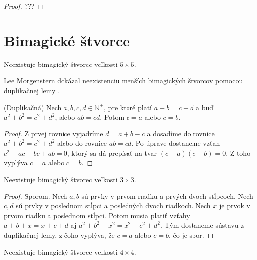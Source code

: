 \begin{proof} 
???
\end{proof}

\section{Bimagické štvorce}

\begin{hypothesis} Neexistuje bimagický štvorec veľkosti $5 \times 5$.
\end{hypothesis}

Lee Morgenstern dokázal neexistenciu menších bimagických štvorcov pomocou duplikačnej lemy \cite{multimagie}.

\begin{lemma} (Duplikačná) Nech $a,b,c,d \in \mathbb{N^+}$, pre ktoré platí $a + b = c + d$ a buď $a^2 + b^2 = c^2 + d^2$, alebo $ab = cd$. Potom $c = a$ alebo $c = b$.
\end{lemma}
 
\begin{proof} Z prvej rovnice vyjadríme $d = a + b - c$ a dosadíme do rovnice $a^2 + b^2 = c^2 + d^2$ alebo do rovnice $ab = cd$. Po úprave dostaneme vzťah $c^2 - ac - bc + ab = 0$, ktorý sa dá prepísať na tvar $(c - a)(c - b) = 0$. Z toho vyplýva $c = a$ alebo $c = b$.
\end{proof} 


\begin{theorem} Neexistuje bimagický štvorec veľkosti $3 \times 3$.
\end{theorem}

\begin{proof} Sporom. Nech $a,b$ sú prvky v prvom riadku a prvých dvoch stĺpcoch. Nech $c,d$ sú prvky v poslednom stĺpci a posledných dvoch riadkoch. Nech $x$ je prvok v prvom riadku a poslednom stĺpci. Potom musia platiť vzťahy $a + b + x = x + c + d$ aj $a^2 + b^2 + x^2 = x^2 + c^2 + d^2$. Tým dostaneme sústavu z duplikačnej lemy, z čoho vyplýva, že $c = a$ alebo $c = b$, čo je spor.
\end{proof} 

\begin{theorem} Neexistuje bimagický štvorec veľkosti $4 \times 4$.
\end{theorem}

